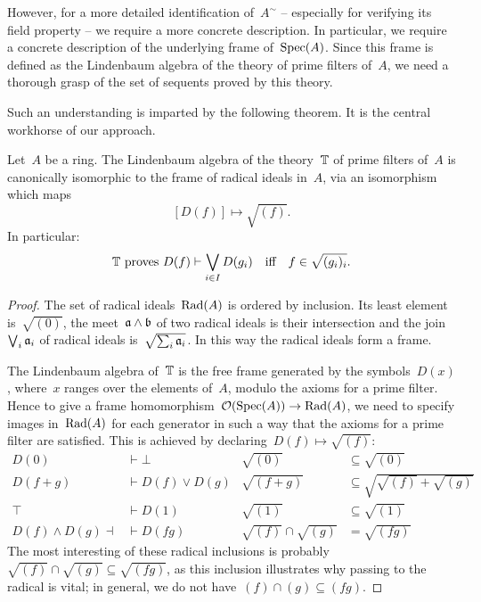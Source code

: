 \documentclass{ws-rv9x6}
\begin{document}
{However, for a more detailed identification of~$A^\sim$ -- especially for
verifying its field property -- we require a more concrete description. In
particular, we require a concrete description of the underlying frame
of~$\mathrm{Spec}(A)$. Since this frame is defined as the Lindenbaum algebra of the
theory of prime filters of~$A$, we need a thorough grasp of the set of sequents proved by
this theory.

Such an understanding is imparted by the following theorem. It is the
central workhorse of our approach.

\begin{theorem}\label{thm:workhorse}
Let~$A$ be a ring. The Lindenbaum algebra of the theory~$\mathbb{T}$ of prime filters
of~$A$ is canonically isomorphic to the frame of radical ideals in~$A$, via an
isomorphism which maps
\[ [D(f)] \longmapsto \sqrt{(f)}. \]
In particular:
\[
  \textnormal{$\mathbb{T}$ proves~$D(f) \vdash \bigvee_{i \in I} D(g_i)$} \quad\text{iff}\quad
    f \in \sqrt{(g_i)_i}. \]
\end{theorem}

\begin{proof}The set of radical ideals~$\mathrm{Rad}(A)$ is ordered by inclusion. Its
least element is~$\sqrt{(0)}$, the meet~$\mathfrak{a} \wedge \mathfrak{b}$ of two radical
ideals is their intersection and the join~$\bigvee_i \mathfrak{a}_i$ of radical ideals
is~$\sqrt{\sum_i \mathfrak{a}_i}$. In this way the radical ideals form a frame.

The Lindenbaum algebra of~$\mathbb{T}$ is the free frame generated by the symbols~$D(x)$,
where~$x$ ranges over the elements of~$A$, modulo the axioms for a prime
filter. Hence to give a frame homomorphism~$\mathcal{O}(\mathrm{Spec}(A)) \to \mathrm{Rad}(A)$, we need
to specify images in~$\mathrm{Rad}(A)$ for each generator in such a way that the
axioms for a prime filter are satisfied. This is achieved by declaring~$D(f)
\mapsto \sqrt{(f)}$:
\begin{align*}
  D(0) &\vdash \bot & \sqrt{(0)} &\subseteq \sqrt{(0)} \\
  D(f+g) &\vdash D(f) \vee D(g) & \sqrt{(f+g)} &\subseteq\textstyle \sqrt{\sqrt{(f)} + \sqrt{(g)}} \\
  \top &\vdash D(1) & \sqrt{(1)} &\subseteq \sqrt{(1)} \\
  D(f) \wedge D(g) \dashv\!&\vdash D(fg) & \sqrt{(f)} \cap \sqrt{(g)} &= \sqrt{(fg)}
\end{align*}
The most interesting of these radical inclusions is probably~$\sqrt{(f)} \cap
\sqrt{(g)} \subseteq \sqrt{(fg)}$, as this inclusion illustrates why passing to the
radical is vital; in general, we do not have~$(f) \cap (g) \subseteq (fg)$.


\end{proof}}
\end{document}
